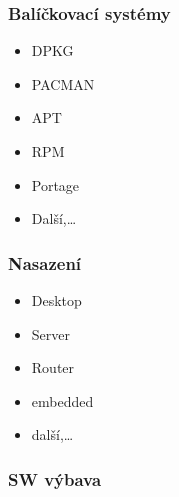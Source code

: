 \documentclass[a4paper,12pt]{article}
\begin{document}
\subsubsection{Balíčkovací systémy}
\begin{itemize}
 \item DPKG
\end{itemize}
\begin{itemize}
 \item PACMAN
\end{itemize}
\begin{itemize}
 \item APT
\end{itemize}
\begin{itemize}
 \item RPM
\end{itemize}
\begin{itemize}
 \item Portage
\end{itemize}
\begin{itemize}
 \item Další,…
\end{itemize}

\subsubsection{Nasazení}
\begin{itemize}
 \item Desktop
\end{itemize}

\begin{itemize}
 \item Server
\end{itemize}

\begin{itemize}
 \item Router
\end{itemize}

\begin{itemize}
 \item embedded
\end{itemize}

\begin{itemize}
 \item další,…
\end{itemize}

\subsubsection{SW výbava}
\end{document}
